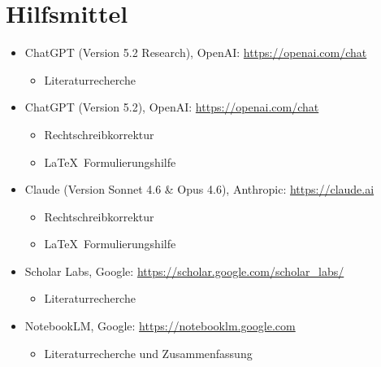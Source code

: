 \section*{Hilfsmittel}
\begin{itemize}
  \item ChatGPT (Version 5.2 Research), OpenAI: \url{https://openai.com/chat}
    \begin{itemize}
      \item Literaturrecherche
    \end{itemize}

  \item ChatGPT (Version 5.2), OpenAI: \url{https://openai.com/chat}
    \begin{itemize}
        \item Rechtschreibkorrektur
        \item \LaTeX\ Formulierungshilfe
    \end{itemize}

  \item Claude (Version Sonnet 4.6 \& Opus 4.6), Anthropic: \url{https://claude.ai}
    \begin{itemize}
        \item Rechtschreibkorrektur
        \item \LaTeX\ Formulierungshilfe
    \end{itemize}

  \item Scholar Labs, Google: \url{https://scholar.google.com/scholar_labs/}
    \begin{itemize}
      \item Literaturrecherche
    \end{itemize}

  \item NotebookLM, Google: \url{https://notebooklm.google.com}
    \begin{itemize}
      \item Literaturrecherche und Zusammenfassung
    \end{itemize}
\end{itemize}